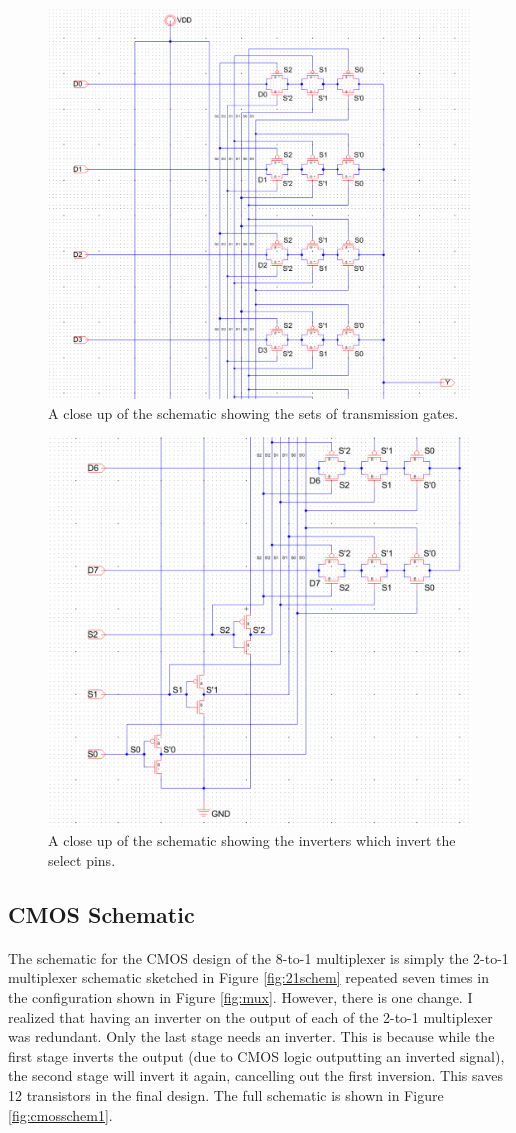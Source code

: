 \documentclass{article}
\begin{document}
    \begin{figure}[H]
      \centering
      \includegraphics[width=0.6\linewidth, frame]{screenshots/tg/schem/schem2.png}
      \caption{A close up of the schematic showing the sets of transmission gates.}
      \label{fig:tgschem2}
    \end{figure}

    \begin{figure}[H]
      \centering
      \includegraphics[width=0.6\linewidth, frame]{screenshots/tg/schem/schem3.png}
      \caption{A close up of the schematic showing the inverters which invert the select pins.}
      \label{fig:tgschem3}
    \end{figure}

  \subsection{CMOS Schematic}
    \paragraph{}
    The schematic for the CMOS design of the 8-to-1 multiplexer is simply the 2-to-1 multiplexer schematic sketched in Figure \ref{fig:21schem} repeated seven times in the configuration shown in Figure \ref{fig:mux}. However, there is one change. I realized that having an inverter on the output of each of the 2-to-1 multiplexer was redundant. Only the last stage needs an inverter. This is because while the first stage inverts the output (due to CMOS logic outputting an inverted signal), the second stage will invert it again, cancelling out the first inversion. This saves 12 transistors in the final design. The full schematic is shown in Figure \ref{fig:cmosschem1}.
\end{document}
